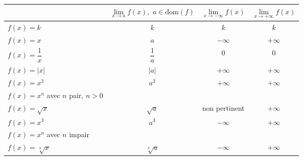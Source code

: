 \documentclass[a4paper,12pt]{report}
\newcommand{\dom}{\mathrm{dom}}
\newcommand{\pinf}{+\infty}
\newcommand{\minf}{-\infty}
\begin{document}
\begin{center}
\begin{tabular}{l|c|c|c|}
\cline{2-4}
                                                 & $\lim\limits_{x\to a}f(x),\,\, a\in\dom(f)$ & $\lim\limits_{x\to \minf}f(x)$ & $\lim\limits_{x\to \pinf}f(x)$ \\ \hline
\multicolumn{1}{|l|}{$f(x)=k$}                   &         $k$                                   &      $k$                          &         $k$                       \\ \hline
\multicolumn{1}{|l|}{$f(x)=x$}                   &         $a$                                   &      $\minf$                          &        $\pinf$                        \\ \hline
\multicolumn{1}{|l|}{\rule[-12pt]{0pt}{33pt}$f(x)=\dfrac{1}{x}$}        &         $\dfrac{1}{a}$                                   &  0                              &         $0$                       \\ \hline
\multicolumn{1}{|l|}{$f(x)=|x|$}                 &         $|a|$                                   &           $\pinf$                     &            $\pinf$                    \\ \hline
\multicolumn{1}{|l|}{$f(x)=x^2$}                 &         $a^2$                                   &           $\pinf$                     &             $\pinf$                   \\ \hline
\multicolumn{1}{|l|}{$f(x)=x^n$ avec $n$ pair, $n>0$}   &                                            &                                &                                \\ \hline
\multicolumn{1}{|l|}{$f(x)=\sqrt{x}$}            &         $\sqrt{a}$                                   &            non pertinent                    &        $\pinf$                        \\ \hline
\multicolumn{1}{|l|}{$f(x)=x^3$}                 &         $a^3$                                   &                   $\minf$             &                   $\pinf$             \\ \hline
\multicolumn{1}{|l|}{$f(x)=x^n$ avec $n$ impair} &                                            &                                &                                \\ \hline
\multicolumn{1}{|l|}{$f(x)=\sqrt[3]{x}$}         &         $\sqrt[3]{a}$                                   &            $\minf$                    &                 $\pinf$               \\ \hline
\end{tabular}
\end{center}
\end{document}
